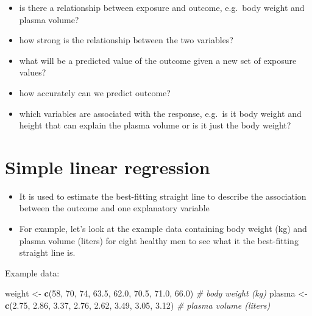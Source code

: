 \documentclass[
]{book}
\newenvironment{Shaded}{\begin{snugshade}}{\end{snugshade}}
\newcommand{\CommentTok}[1]{\textcolor[rgb]{0.56,0.35,0.01}{\textit{#1}}}
\newcommand{\DecValTok}[1]{\textcolor[rgb]{0.00,0.00,0.81}{#1}}
\newcommand{\FloatTok}[1]{\textcolor[rgb]{0.00,0.00,0.81}{#1}}
\newcommand{\KeywordTok}[1]{\textcolor[rgb]{0.13,0.29,0.53}{\textbf{#1}}}
\newcommand{\NormalTok}[1]{#1}
\newcommand{\StringTok}[1]{\textcolor[rgb]{0.31,0.60,0.02}{#1}}
\providecommand{\tightlist}{%
  \setlength{\itemsep}{0pt}\setlength{\parskip}{0pt}}
\theoremstyle{definition}
\theoremstyle{definition}
\theoremstyle{definition}
\theoremstyle{remark}
\begin{document}
\begin{itemize}
\tightlist
\item
  is there a relationship between exposure and outcome, e.g.~body weight and plasma volume?
\item
  how strong is the relationship between the two variables?
\item
  what will be a predicted value of the outcome given a new set of exposure values?
\item
  how accurately can we predict outcome?
\item
  which variables are associated with the response, e.g.~is it body weight and height that can explain the plasma volume or is it just the body weight?
\end{itemize}

\hypertarget{simple-linear-regression}{%
\section{Simple linear regression}\label{simple-linear-regression}}

\begin{itemize}
\tightlist
\item
  It is used to estimate the best-fitting straight line to describe the association between the outcome and one explanatory variable
\item
  For example, let's look at the example data containing body weight (kg) and plasma volume (liters) for eight healthy men to see what it the best-fitting straight line is.
\end{itemize}

Example data:

\begin{Shaded}
\begin{Highlighting}[]
\NormalTok{weight \textless{}{-}}\StringTok{ }\KeywordTok{c}\NormalTok{(}\DecValTok{58}\NormalTok{, }\DecValTok{70}\NormalTok{, }\DecValTok{74}\NormalTok{, }\FloatTok{63.5}\NormalTok{, }\FloatTok{62.0}\NormalTok{, }\FloatTok{70.5}\NormalTok{, }\FloatTok{71.0}\NormalTok{, }\FloatTok{66.0}\NormalTok{) }\CommentTok{\# body weight (kg)}
\NormalTok{plasma \textless{}{-}}\StringTok{ }\KeywordTok{c}\NormalTok{(}\FloatTok{2.75}\NormalTok{, }\FloatTok{2.86}\NormalTok{, }\FloatTok{3.37}\NormalTok{, }\FloatTok{2.76}\NormalTok{, }\FloatTok{2.62}\NormalTok{, }\FloatTok{3.49}\NormalTok{, }\FloatTok{3.05}\NormalTok{, }\FloatTok{3.12}\NormalTok{) }\CommentTok{\# plasma volume (liters)}
\end{Highlighting}
\end{Shaded}
\end{document}
